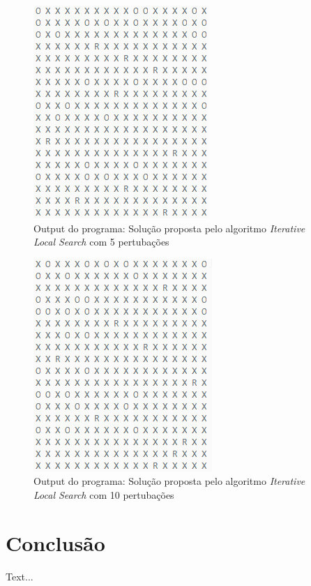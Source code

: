 \documentclass[
	article,			%
	11pt,				%
	oneside,			%
	a4paper,			%
	english,			%
	brazil,				%
	sumario=tradicional
	]{abntex2}
\begin{document}
\begin{figure}
  \centering
  \includegraphics[width=0.30\linewidth]{ils5_18.png}
  \caption{Output do programa: Solução proposta pelo algoritmo \textit{Iterative Local Search} com 5 pertubações}
  \label{ils5}
\end{figure}

\begin{figure}
  \centering
  \includegraphics[width=0.30\linewidth]{ils10_18.png}
  \caption{Output do programa: Solução proposta pelo algoritmo \textit{Iterative Local Search} com 10 pertubações}
  \label{ils10}
\end{figure}


\section{Conclusão}

Text...
% 

\postextual

%

\end{document}

